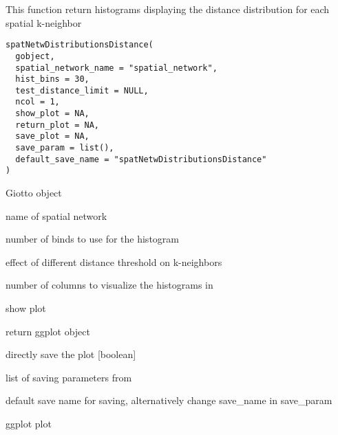 \documentclass[a4paper]{book}
\begin{document}
%
\begin{Description}\relax
This function return histograms displaying the distance distribution for each spatial k-neighbor
\end{Description}
%
\begin{Usage}
\begin{verbatim}
spatNetwDistributionsDistance(
  gobject,
  spatial_network_name = "spatial_network",
  hist_bins = 30,
  test_distance_limit = NULL,
  ncol = 1,
  show_plot = NA,
  return_plot = NA,
  save_plot = NA,
  save_param = list(),
  default_save_name = "spatNetwDistributionsDistance"
)
\end{verbatim}
\end{Usage}
%
\begin{Arguments}
\begin{ldescription}
\item[\code{gobject}] Giotto object

\item[\code{spatial\_network\_name}] name of spatial network

\item[\code{hist\_bins}] number of binds to use for the histogram

\item[\code{test\_distance\_limit}] effect of different distance threshold on k-neighbors

\item[\code{ncol}] number of columns to visualize the histograms in

\item[\code{show\_plot}] show plot

\item[\code{return\_plot}] return ggplot object

\item[\code{save\_plot}] directly save the plot [boolean]

\item[\code{save\_param}] list of saving parameters from 

\item[\code{default\_save\_name}] default save name for saving, alternatively change save\_name in save\_param
\end{ldescription}
\end{Arguments}
%
\begin{Value}
ggplot plot
\end{Value}
\end{document}
